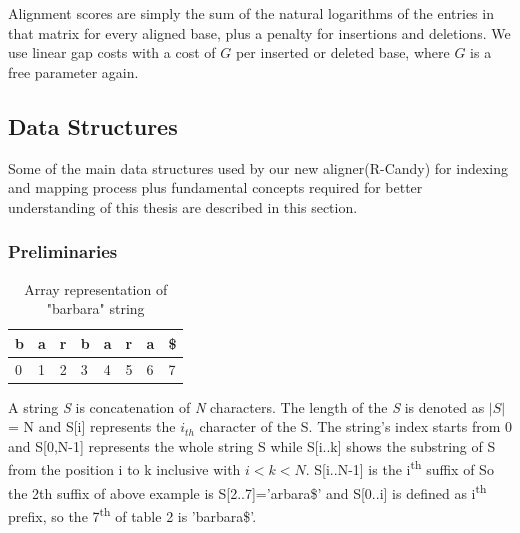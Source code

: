 \documentclass[11pt,a4paper]{report}
\begin{document}
Alignment scores are simply the sum of the natural logarithms of the
entries in that matrix for every aligned base, plus a penalty for
insertions and deletions.  We use linear gap costs with a cost of $G$
per inserted or deleted base, where $G$ is a free parameter again.



\subsection{Data Structures}  \label{Data Structures}

Some of the main data structures used by our new aligner(R-Candy) for indexing and 
mapping process plus fundamental concepts required for better understanding of this 
thesis are described in this section. 






\subsubsection{Preliminaries} \label{Preliminaries}

\begin{table}[h]
 \centering
  \begin{tabular}{ | p{0.5cm} | p{0.5cm} | p{0.5cm} |p{0.5cm} |p{0.5cm} |p{0.5cm} |p{0.5cm} |p{0.5cm} |}
    \hline
  \textbf{b} & \textbf{a } &\textbf{r}  &\textbf{b} &\textbf{a} &\textbf{r} &\textbf{a} &\textbf{\$}\\ \hline
       0 & 1 &2&3&4&5&6&7 \\ \hline
      
   \end{tabular}
\caption{Array representation of "barbara" string}
\label{Array-representation}
\end{table}



A string \emph{S} is concatenation of \emph{N} characters. 
The length of the \emph{S} is denoted as $\lvert S \rvert$ = N and S[i] represents 
the $i_{th}$ character of the S.
The string's index starts from 0 and S[0,N-1] represents the whole string S while 
S[i..k] shows the substring of S from the position i to k inclusive with $i < k < N$. 
S[i..N-1] is the i\textsuperscript{th} suffix of So the 2th suffix of above example is S[2..7]='arbara\$' and
S[0..i] is defined as i\textsuperscript{th} prefix, so the 7\textsuperscript{th} of table 2 is 'barbara\$'.
 
\end{document}
